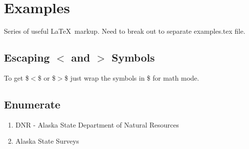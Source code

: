 
\newpage
\section{Examples}
Series of useful \LaTeX\ markup. Need to break out to 
separate examples.tex file.


\subsection{Escaping $<$ and $>$ Symbols}
To get \$$<$\$ or \$$>$\$ just wrap the symbols in \$ for math mode.

\subsection{Enumerate}
\begin{enumerate}
  \item{DNR} - Alaska State Department of Natural Resources

  \item{Alaska State Surveys}
\end{enumerate}
